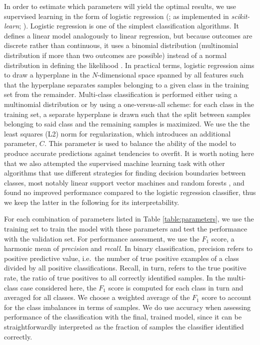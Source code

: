 \documentclass[fleqn,usenatbib]{mnras}
\begin{document}
In order to estimate which parameters will yield the optimal results, we use supervised learning in the form of logistic regression (\citealt{cox1958}; as implemented in \textit{scikit-learn}; \citealt{scikit-learn}). Logistic regression is one of the simplest classification algorithms. It defines a linear model analogously to linear regression, but because outcomes are discrete rather than continuous, it uses a binomial distribution (multinomial distribution if more than two outcomes are possible) instead of a normal distribution in defining the likelihood \citep{cox1958}. In practical terms, logistic regression aims to draw a hyperplane in the $N$-dimensional space spanned by all features such that the hyperplane separates samples belonging to a given class in the training set from the remainder. Multi-class classification is performed either using a multinomial distribution or by using a one-versus-all scheme: for each class in the training set, a separate hyperplane is drawn such that the split between samples belonging to said class and the remaining samples is maximized. We use the the least squares (L2) norm for regularization, which introduces an additional parameter, $C$. This parameter is used to balance the ability of the model to produce accurate predictions against tendencies to overfit. It is worth noting here that we also attempted the supervised machine learning task with other algorithms that use different strategies for finding decision boundaries between classes, most notably linear support vector machines \citep{guyon1993,cortes1995} and random forests \citep{breiman2001}, and found no improved performance compared to the logistic regression classifier, thus we keep the latter in the following for its interpretability.

For each combination of parameters listed in Table \ref{table:parameters}, we use the training set to train the model with these parameters and test the performance with the validation set. For performance assessment, we use the $F_1$ score, a harmonic mean of \textit{precision} and \textit{recall}. In binary classification, precision refers to positive predictive value, i.e.\ the number of true positive examples of a class divided by all positive classifications. Recall, in turn, refers to the true positive rate, the ratio of true positives to all correctly identified samples. In the multi-class case considered here, the $F_1$ score is computed for each class in turn and averaged for all classes. We choose a weighted average of the $F_1$ score to account for the class imbalances in terms of samples. %
We do use accuracy when assessing performance of the classification with the final, trained model, since it can be straightforwardly interpreted as the fraction of samples the classifier identified correctly.
\end{document}
